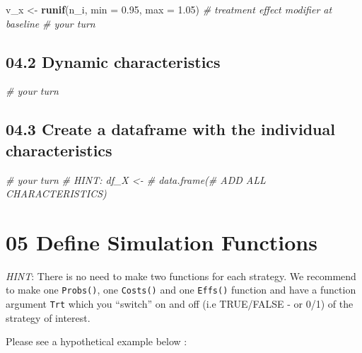 \documentclass[
]{article}
\newenvironment{Shaded}{\begin{snugshade}}{\end{snugshade}}
\newcommand{\CommentTok}[1]{\textcolor[rgb]{0.56,0.35,0.01}{\textit{#1}}}
\newcommand{\DataTypeTok}[1]{\textcolor[rgb]{0.13,0.29,0.53}{#1}}
\newcommand{\FloatTok}[1]{\textcolor[rgb]{0.00,0.00,0.81}{#1}}
\newcommand{\KeywordTok}[1]{\textcolor[rgb]{0.13,0.29,0.53}{\textbf{#1}}}
\newcommand{\NormalTok}[1]{#1}
\newcommand{\StringTok}[1]{\textcolor[rgb]{0.31,0.60,0.02}{#1}}
\begin{document}
\begin{Shaded}
\begin{Highlighting}[]
\NormalTok{v_x     <-}\StringTok{ }\KeywordTok{runif}\NormalTok{(n_i, }\DataTypeTok{min =} \FloatTok{0.95}\NormalTok{, }\DataTypeTok{max =} \FloatTok{1.05}\NormalTok{) }\CommentTok{# treatment effect modifier at baseline }
\CommentTok{# your turn}
\end{Highlighting}
\end{Shaded}

\hypertarget{dynamic-characteristics}{%
\subsection{04.2 Dynamic
characteristics}\label{dynamic-characteristics}}

\begin{Shaded}
\begin{Highlighting}[]
\CommentTok{# your turn}
\end{Highlighting}
\end{Shaded}

\hypertarget{create-a-dataframe-with-the-individual-characteristics}{%
\subsection{04.3 Create a dataframe with the individual
characteristics}\label{create-a-dataframe-with-the-individual-characteristics}}

\begin{Shaded}
\begin{Highlighting}[]
\CommentTok{# your turn}
\CommentTok{# HINT: df_X <- # data.frame(# ADD ALL CHARACTERISTICS) }
\end{Highlighting}
\end{Shaded}

\hypertarget{define-simulation-functions}{%
\section{05 Define Simulation
Functions}\label{define-simulation-functions}}

\emph{HINT}: There is no need to make two functions for each strategy.
We recommend to make one \texttt{Probs()}, one \texttt{Costs()} and one
\texttt{Effs()} function and have a function argument \texttt{Trt} which
you ``switch'' on and off (i.e TRUE/FALSE - or 0/1) of the strategy of
interest.

Please see a hypothetical example below :
\end{document}

